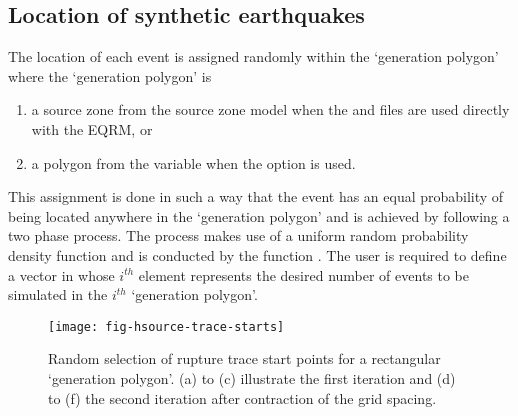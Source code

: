 \subsection{Location of synthetic earthquakes}
\label{sec:rup-location}

The location of each event is assigned randomly within the
`generation polygon' where the
`generation polygon' is
\begin{enumerate}
\item a source zone from the source zone model when the
 and
 files are
used directly with the EQRM, or \item a polygon from the
 variable when the
  option is used.
\end{enumerate}
 This assignment is done in such a way that the event has
an equal probability of being located anywhere in the `generation
polygon' and is achieved by following a two phase process. The
process makes use of a uniform random probability density function
and is conducted by the function . The
user is required to define a vector  in
 whose $i^{th}$ element represents the
desired number of events to be simulated in the $i^{th}$
`generation polygon'.

\begin{figure}
\begin{center}
\texttt{[image: fig-hsource-trace-starts]}
\end{center}
\caption{Random selection of rupture trace start points for a
rectangular `generation polygon'. (a) to (c) illustrate the first
iteration and (d) to (f) the second iteration after contraction of
the grid spacing.} \label{fig:source-trace-starts}
\end{figure}


